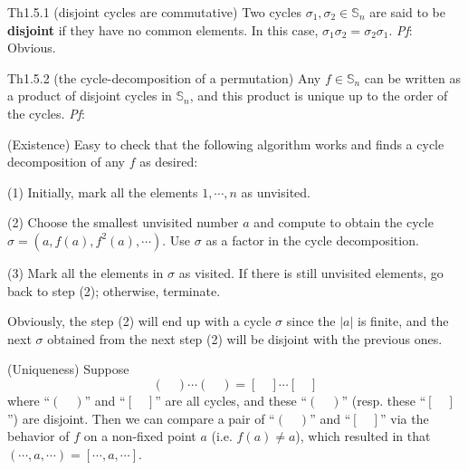 \documentclass{article}
\begin{document}
\begin{Th}{Th1.5.1 (disjoint cycles are commutative)}
    \textcolor{Df}{Two cycles $\sigma_1, \sigma_2\in\mathbb{S}_n$ are said to be \textbf{disjoint} if they have no common elements.} In this case, $\sigma_1\sigma_2 = \sigma_2\sigma_1$.
    \tcblower
    \textit{Pf}: Obvious.
\end{Th}

\begin{Th}{Th1.5.2 (the cycle-decomposition of a permutation)}
    Any $f\in\mathbb{S}_n$ can be written as a product of disjoint cycles in $\mathbb{S}_n$, and this product is unique up to the order of the cycles.
    \tcblower
    \textit{Pf}: 
    \begin{compactenum}
        \item (Existence) Easy to check that the following algorithm works and finds a cycle decomposition of any $f$ as desired:
        \begin{compactenum}
            \item[(1)] Initially, mark all the elements $1, \cdots, n$ as unvisited.
            \item[(2)] Choose the smallest unvisited number $a$ and compute to obtain the cycle $\sigma = (a, f(a), f^2(a), \cdots)$. Use $\sigma$ as a factor in the cycle decomposition.
            \item[(3)] Mark all the elements in $\sigma$ as visited. If there is still unvisited elements, go back to step (2); otherwise, terminate.
        \end{compactenum}
        Obviously, the step (2) will end up with a cycle $\sigma$ since the $|a|$ is finite, and the next $\sigma$ obtained from the next step (2) will be disjoint with the previous ones.
        \item (Uniqueness) Suppose 
        $$ (\quad)\cdots(\quad) = [\quad]\cdots[\quad] $$
        where ``$(\quad)$'' and ``$[\quad]$'' are all cycles, and these ``$(\quad)$'' (resp. these ``$[\quad]$'') are disjoint. Then we can compare a pair of ``$(\quad)$'' and ``$[\quad]$'' via the behavior of $f$ on a non-fixed point $a$ (i.e. $f(a)\neq a$), which resulted in that $(\cdots, a, \cdots) = [\cdots, a, \cdots]$. 
    \end{compactenum}
\end{Th}
\end{document}
